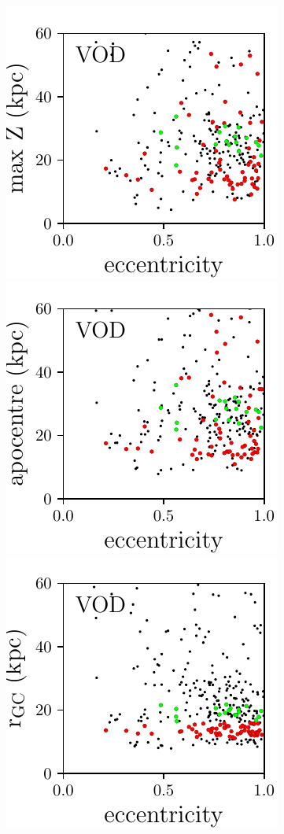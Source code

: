 \documentclass[fleqn,usenatbib]{mnras}
\begin{document}
\begin{figure}
	\includegraphics[scale=0.473]{VOD_orbits_ecc_z.pdf}
    \includegraphics[scale=0.473]{VOD_orbits_apo_ecc.pdf} 
  \includegraphics[scale=0.473]{VOD_orbits_ecc_r.pdf} \\

\end{figure}
\end{document}
